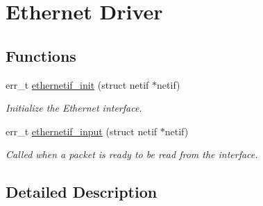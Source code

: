 \hypertarget{group__ethernet__driver}{\section{Ethernet Driver}
\label{group__ethernet__driver}
}
\subsection*{Functions}
\begin{DoxyCompactItemize}
\item 
\hypertarget{group__ethernet__driver_ga7ce979d0ec31575ecf17998b7bd9abb2}{err\-\_\-t \hyperlink{group__ethernet__driver_ga7ce979d0ec31575ecf17998b7bd9abb2}{ethernetif\-\_\-init} (struct netif $\ast$netif)}\label{group__ethernet__driver_ga7ce979d0ec31575ecf17998b7bd9abb2}

\begin{DoxyCompactList}\small\item\em Initialize the Ethernet interface. \end{DoxyCompactList}\item 
\hypertarget{group__ethernet__driver_ga10211a021d1a1fe2398d246eb76ac354}{err\-\_\-t \hyperlink{group__ethernet__driver_ga10211a021d1a1fe2398d246eb76ac354}{ethernetif\-\_\-input} (struct netif $\ast$netif)}\label{group__ethernet__driver_ga10211a021d1a1fe2398d246eb76ac354}

\begin{DoxyCompactList}\small\item\em Called when a packet is ready to be read from the interface. \end{DoxyCompactList}\end{DoxyCompactItemize}


\subsection{Detailed Description}
